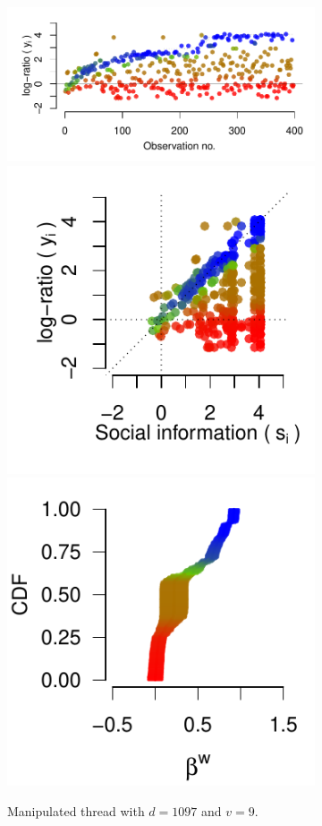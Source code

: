 \documentclass[9pt,a4paper,twocolumn,lineno]{article}
\begin{document}
\begin{figure}[!h]
\begin{subfigure}{.44\linewidth}
		\includegraphics[width=1\linewidth]{threads/thread_max_1097_9.pdf}
		\includegraphics[width=.48\linewidth]{info/info_max_1097_9.pdf}
		\includegraphics[width=.48\linewidth]{betas/beta_max_1097_9.pdf}
		\caption{\footnotesize Manipulated thread with $d=1097$ and $v=9$.}
		\label{fig: h=max d=1097, v=9}
	\end{subfigure}
	\begin{subfigure}{.1\linewidth}
		\centering

\end{subfigure}
\end{figure}
\end{document}
